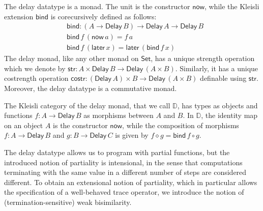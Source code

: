 \documentclass[runningheads,a4paper]{llncs}
\newcommand{\Set}{\mathsf{Set}}
\newcommand{\comp}{\circ}
\newcommand{\Delay}{\ensuremath{\mathsf{Delay}\,}}
\newcommand{\now}{\mathsf{now}}
\newcommand{\later}{\mathsf{later}}
\newcommand{\bind}{\mathsf{bind}}
\newcommand{\str}{\mathsf{str}}
\newcommand{\costr}{\mathsf{costr}}
\newcommand{\D}{\mathbb{D}}
\begin{document}
The delay datatype is a monad. The unit is the constructor $\now$,
while the Kleisli extension $\bind$ is corecursively defined as follows:
\begin{align*}
& \bind : (A \to \Delay B) \to \Delay A \to \Delay B \\
& \bind \,f \, (\now\,a) = f\,a \\
& \bind\,f\,(\later\,x) = \later\,(\bind\,f\,x)
\end{align*}
The delay monad, like any other monad on $\Set$, has a unique strength
operation which we denote by $\str : A \times \Delay B \to \Delay (A
\times B)$. Similarly, it has a unique costrength operation $\costr :
(\Delay A) \times B \to \Delay (A \times B)$ definable using $\str$. Moreover, the delay datatype is a commutative monad.

The Kleisli category of the delay monad, that we call $\D$, has types
as objects and functions $f : A \to \Delay B$ as morphisms between $A$
and $B$. In $\D$, the identity map on an object $A$ is the constructor
$\now$, while the composition of morphisms $f : A \to \Delay B$ and $g
: B \to \Delay C$ is given by $f \diamond g = \bind\,f \comp g$.

The delay datatype allows us to program with partial functions, but
the introduced notion of partiality is intensional, in the sense that
computations terminating with the same value in a different number of
steps are considered different. To obtain an extensional notion of
partiality, which in particular allows the specification of a
well-behaved trace operator, we introduce the notion of (termination-sensitive)
weak bisimilarity.
\end{document}
